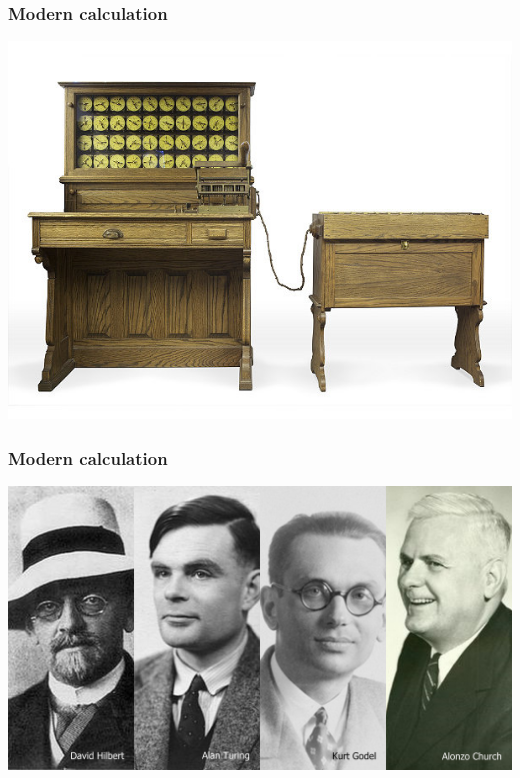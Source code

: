 \documentclass[11pt]{beamer}
\begin{document}
\begin{frame}[fragile]
  \frametitle{Modern calculation}

  \includegraphics[height=0.75\textheight]{./img/ibm.jpg}
\end{frame}

\begin{frame}[fragile]
  \frametitle{Modern calculation}

  \includegraphics[width=\textwidth]{./img/turing-et-al.jpg}
\end{frame}
\end{document}
